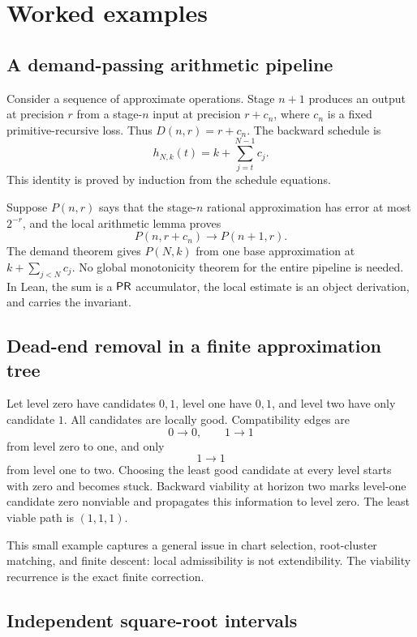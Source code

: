 \section{Worked examples}
\label{sec:examples}

\subsection{A demand-passing arithmetic pipeline}

Consider a sequence of approximate operations.  Stage \(n+1\) produces an
output at precision \(r\) from a stage-\(n\) input at precision \(r+c_n\), where
\(c_n\) is a fixed primitive-recursive loss.  Thus
\(D(n,r)=r+c_n\).  The backward schedule is
\[
 h_{N,k}(t)=k+\sum_{j=t}^{N-1}c_j.
\]
This identity is proved by induction from the schedule equations.

Suppose \(P(n,r)\) says that the stage-\(n\) rational approximation has error at
most \(2^{-r}\), and the local arithmetic lemma proves
\[
 P(n,r+c_n)\to P(n+1,r).
\]
The demand theorem gives \(P(N,k)\) from one base approximation at
\(k+\sum_{j<N}c_j\).  No global monotonicity theorem for the entire pipeline is
needed.  In Lean, the sum is a \(\mathsf{PR}\) accumulator, the local estimate is an
object derivation, and  carries the invariant.

\subsection{Dead-end removal in a finite approximation tree}

Let level zero have candidates \(0,1\), level one have \(0,1\), and level two
have only candidate \(1\).  All candidates are locally good.  Compatibility
edges are
\[
 0\to0,\qquad 1\to1
\]
from level zero to one, and only
\[
 1\to1
\]
from level one to two.  Choosing the least good candidate at every level starts
with zero and becomes stuck.  Backward viability at horizon two marks level-one
candidate zero nonviable and propagates this information to level zero.  The
least viable path is \((1,1,1)\).

This small example captures a general issue in chart selection, root-cluster
matching, and finite descent: local admissibility is not extendibility.  The
viability recurrence is the exact finite correction.

\subsection{Independent square-root intervals}

